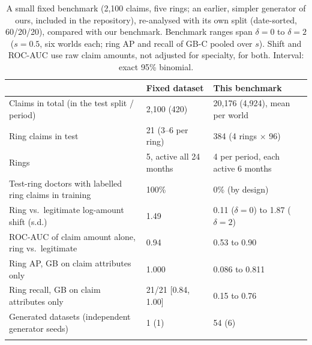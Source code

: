 \begin{table}[h]
\caption{A small fixed benchmark (2,100 claims, five rings; an earlier, simpler generator of ours, included in the repository), re-analysed with its own split (date-sorted, 60/20/20), compared with our benchmark. Benchmark ranges span $\delta=0$ to $\delta=2$ ($s=0.5$, six worlds each; ring AP and recall of GB-C pooled over $s$). Shift and ROC-AUC use raw claim amounts, not adjusted for specialty, for both. Interval: exact 95\% binomial.}\label{tab:legacy}
\scriptsize
\begin{tabular}{@{}p{5.0cm}p{3.1cm}p{3.6cm}@{}}
\toprule
 & Fixed dataset & This benchmark \\
\midrule
Claims in total (in the test split / period) & 2,100 (420) & 20,176 (4,924), mean per world \\
Ring claims in test & 21 (3--6 per ring) & 384 (4 rings $\times$ 96) \\
Rings & 5, active all 24 months & 4 per period, each active 6 months \\
Test-ring doctors with labelled ring claims in training & 100\% & 0\% (by design) \\
Ring vs.\ legitimate log-amount shift (s.d.) & 1.49 & 0.11 ($\delta=0$) to 1.87 ($\delta=2$) \\
ROC-AUC of claim amount alone, ring vs.\ legitimate & 0.94 & 0.53 to 0.90 \\
Ring AP, GB on claim attributes only & 1.000 & 0.086 to 0.811 \\
Ring recall, GB on claim attributes only & 21/21 [0.84, 1.00] & 0.15 to 0.76 \\
Generated datasets (independent generator seeds) & 1 (1) & 54 (6) \\
\botrule
\end{tabular}
\end{table}